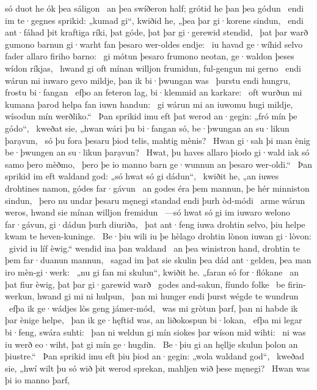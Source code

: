 só duot he ók þea sáligon \hld\ an þea swíðeron half;
grótid he þan þea gódun \hld\ endi im te·gegnes sprikid:
„kumad gi“, kwiðid he, „þea þar gi·korene sindun, \hld\ endi ant·fáhad þit kraftiga ríki,
þat góde, þat þar gi·gerewid stendid, \hld\ þat þar warð gumono barnun
gi·warht fan þesaro wer-oldes endje: \hld\ iu havad ge·wíhid selvo
fader allaro firiho barno: \hld\ gi mótun þesaro frumono neotan,
ge·waldon þeses wídon ríkjas, \hld\ hwand gi oft mínan willjon frumidun,
ful-gengun mi gerno \hld\ endi wárun mi iuwaro gevo mildje,
þan ik bi·þwungan was \hld\ þurstu endi hungru,
frostu bi·fangan \hld\ efþo an feteron lag,
bi·klemmid an karkare: \hld\ oft wurðun mi kumana þarod
helpa fan iuwn handun: \hld\ gi wárun mi an iuwomu hugi mildje,
wísodun mín werðliko.“ \hld\ Þan sprikid imu eft þat werod an·gegin:
„fró mín þe gódo“, \hld\ kweðat sie, „hwan wári þu bi·fangan só,
be·þwungan an su·likun þarạvun, \hld\ só þu fora þesaru þiod telis,
mahtig mènis? \hld\ Hwan gi·sah þi man ènig
be·þwungen an su·likun þarạvun? \hld\ Hwat, þu haves allaro þiodo gi·wald
iak só samo þero mèðmo, \hld\ þero þe io manno barn
ge·wunnun an þesaro wer-oldi.“ \hld\ Þan sprikid im eft waldand god:
„só hwat só gi dádun“, \hld\ kwiðit he, „an iuwes drohtines namon,
gódes far·gávun \hld\ an godes éra
þem mannun, þe hér minniston sindun, \hld\ þero nu undar þesaru męnegi standad
endi þurh òd-módi \hld\ arme wárun
weros, hwand sie mínan willjon fremidun \hld\ —só hwat só gi im iuwaro welono far·gávun,
gi·dádun þurh diuriða, \hld\ þat ant·feng iuwa drohtin selvo,
þiu helpe kwam te heven-kuninge. \hld\ Be·þiu wili iu þe hèlago drohtin
lònon iuwan gi·lòvon: \hld\ givid iu líf èwig.“
wendid ina þan waldand \hld\ an þea winistron hand,
drohtin te þem far·duanun mannun, \hld\ sagad im þat sie skulin þea dád ant·gelden,
þea man iro mèn-gi·werk: \hld\ „nu gi fan mi skulun“, kwiðit he.
„faran só for·flókane \hld\ an þat fiur èwig,
þat þar gi·garewid warð \hld\ godes and-sakun,
fíundo folke \hld\ be firin-werkun,
hwand gi mi ni hulpun, \hld\ þan mi hunger endi þurst
wégde te wundrun \hld\ efþa ik ge·wádjes lòs
geng jámer-mód, \hld\ was mi gròtun þarf,
þan ni habde ik þar ènige helpe, \hld\ þan ik ge·hęftid was,
an liðokospun bi·lokan, \hld\ efþa mi legar bi·feng,
swára suhti: \hld\ þan ni weldun gi mín siokes þar
wíson mid wihti: \hld\ ni was iu werð eo·wiht,
þat gi mín ge·hugdin. \hld\ Be·þiu gi an hęllje skulun
þolon an þiustre.“ \hld\ Þan sprikid imu eft þiu þiod an·gegin:
„wola waldand god“, \hld\ kweðad sie, „hwí wilt þu só wið þit werod sprekan,
mahljen wið þese męnegi? \hld\ Hwan was þi io manno þarf,
